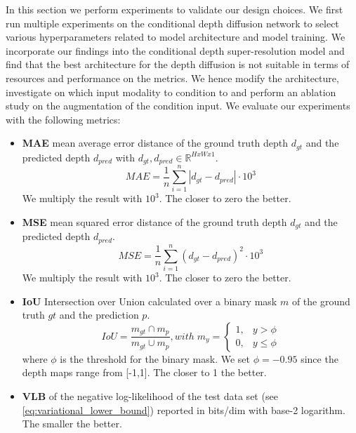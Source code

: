 In this section we perform experiments to validate our design choices. We first run multiple experiments on the conditional depth diffusion network to select various hyperparameters related to model architecture and model training. We incorporate our findings into the conditional depth super-resolution model and find that the best architecture for the depth diffusion is not suitable in terms of resources and performance on the metrics. We hence modify the architecture, investigate on which input modality to condition to and perform an ablation study on the augmentation of the condition input. 
We evaluate our experiments with the following metrics: 
\begin{itemize}
  \item \textbf{MAE} mean average error distance of the ground truth depth $d_{gt}$ and the predicted depth $d_{pred}$ with $d_{gt}, d_{pred} \in \mathbb{R}^{HxWx1}$.
  \begin{equation}
      MAE = \frac{1}{n}\sum_{i=1}^{n}\left|d_{gt}-d_{pred}\right| \cdot 10^{3}
  \end{equation}
  We multiply the result with $10^{3}$. The closer to zero the better.
  \item \textbf{MSE} mean squared error distance of the ground truth depth $d_{gt}$ and the predicted depth $d_{pred}$.
  \begin{equation}
    MSE = \frac{1}{n}\sum_{i=1}^{n}\left(d_{gt}-d_{pred}\right)^2 \cdot 10^{3}
  \end{equation}
  We multiply the result with $10^{3}$. The closer to zero the better.
  \item \textbf{IoU} Intersection over Union calculated over a binary mask $m$ of the ground truth $gt$ and the prediction $p$.  
  \begin{equation}
    IoU = \frac{m_{gt} \cap m_{p}}{m_{gt} \cup m_{p}}, with \; m_{y} = \left\{\begin{array}{ll} 1, & y > \phi \\
         0, & y \le \phi \end{array}\right. 
  \end{equation}
  where $\phi$ is the threshold for the binary mask. We set $\phi=-0.95$ since the depth maps range from [-1,1].
  The closer to 1 the better.
  \item \textbf{VLB} of the negative log-likelihood of the test data set (see \eqref{eq:variational_lower_bound}) reported in bits/dim with base-2 logarithm.
  The smaller the better.
\end{itemize}

